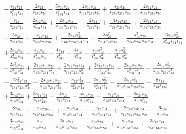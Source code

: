 \begin{align}
  & - \frac{s_{14}s_{23}}{s_{134}^2s_{34}} - \frac{2s_{23}}{s_{134}s_{34}} - \frac{5s_{14}s_{24}}{s_{134}^2s_{34}} - \frac{2s_{14}s_{24}}{s_{134}s_{234}s_{34}} + \frac{s_{23}s_{24}}{s_{134}s_{234}s_{34}} - \frac{2s_{12}s_{24}}{s_{134}s_{234}s_{34}} \nonumber \\
  & - \frac{s_{24}}{s_{234}s_{34}} - \frac{2s_{12}s_{24}}{s_{234}^2s_{34}} + \frac{2s_{12}s_{14}}{s_{134}s_{234}s_{34}} - \frac{2s_{14}}{s_{234}s_{34}} + \frac{4s_{14}s_{23}}{s_{134}s_{234}s_{34}} + \frac{2s_{12}s_{23}}{s_{134}s_{234}s_{34}} \nonumber \\
  & - \frac{5s_{23}}{s_{234}s_{34}} + \frac{s_{14}s_{23}}{s_{134}s_{24}s_{34}} + \frac{2s_{14}s_{23}^2}{s_{134}s_{234}s_{24}s_{34}} - \frac{8s_{23}^2}{s_{234}s_{24}s_{34}} - \frac{s_{14}^2s_{23}}{s_{134}s_{234}s_{24}s_{34}} - \frac{3s_{14}s_{23}^2}{s_{234}^2s_{24}s_{34}} \nonumber \\
  & + \frac{2s_{12}s_{23}}{s_{234}^2s_{34}} - \frac{s_{14}s_{23}}{s_{234}^2s_{34}} - \frac{4s_{12}}{s_{134}^2} - \frac{4s_{12}}{s_{234}^2} - \frac{s_{12}s_{14}^2}{s_{134}^2s_{34}^2} - \frac{s_{12}s_{24}^2}{s_{234}^2s_{34}^2} \nonumber \\
  & - \frac{2s_{14}^2s_{23}}{s_{134}^2s_{34}^2} + \frac{2s_{12}s_{14}s_{24}}{s_{134}s_{234}s_{34}^2} + \frac{2s_{14}s_{23}s_{24}}{s_{134}s_{234}s_{34}^2} + \frac{2s_{12}s_{23}s_{24}}{s_{234}^2s_{34}^2} + \frac{2s_{14}s_{23}s_{24}}{s_{234}^2s_{34}^2} - \frac{2s_{14}s_{23}^2}{s_{134}s_{234}s_{34}^2} \nonumber \\
  & - \frac{2s_{14}^2s_{23}}{s_{134}s_{234}s_{34}^2} - \frac{2s_{12}s_{14}s_{23}}{s_{134}s_{234}s_{34}^2} - \frac{s_{12}s_{23}^2}{s_{234}^2s_{34}^2} - \frac{2s_{14}s_{23}^2}{s_{234}^2s_{34}^2} - \frac{2s_{12}s_{34}^2}{s_{13}s_{134}s_{234}s_{24}} - \frac{8s_{14}}{s_{13}s_{134}} \nonumber \\
  & + \frac{3s_{12}s_{14}}{s_{13}s_{134}^2} + \frac{3s_{14}s_{23}}{s_{13}s_{134}^2} - \frac{4s_{23}}{s_{13}s_{134}} - \frac{4s_{14}s_{24}}{s_{13}s_{134}^2} - \frac{s_{12}s_{24}}{s_{13}s_{134}s_{234}} - \frac{6s_{24}s_{34}}{s_{13}s_{134}^2} \nonumber \\
  & - \frac{8s_{34}}{s_{13}s_{134}} + \frac{s_{12}s_{34}}{s_{13}s_{134}s_{234}} + \frac{s_{12}s_{34}}{s_{13}s_{134}s_{24}} + \frac{s_{12}s_{34}}{s_{13}s_{234}s_{24}} + \frac{2s_{14}s_{23}s_{34}}{s_{13}s_{134}s_{234}s_{24}} - \frac{6s_{34}}{s_{13}s_{24}} \nonumber \\
  & - \frac{3s_{12}s_{34}}{s_{13}s_{134}^2} - \frac{s_{12}}{s_{13}s_{234}} - \frac{2s_{12}s_{14}}{s_{13}s_{134}s_{234}} - \frac{s_{14}s_{23}}{s_{13}s_{134}s_{234}} + \frac{s_{12}s_{23}}{s_{13}s_{134}s_{234}} + \frac{3s_{12}s_{14}}{s_{13}s_{134}s_{24}} \nonumber \\

\end{align}
